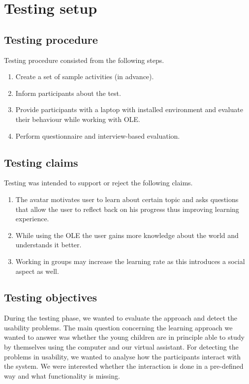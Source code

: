 \documentclass[a4paper]{article}
\begin{document}
\section{Testing setup}

\subsection{Testing procedure} 

Testing procedure consisted from the following steps.

\begin{enumerate}
	\item Create a set of sample activities (in advance).
	\item Inform participants about the test.
	\item Provide participants with a laptop with installed environment and evaluate their behaviour while working with OLE.
	\item Perform questionnaire and interview-based evaluation.
\end{enumerate}

\subsection{Testing claims}

Testing was intended to support or reject the following claims.

\begin{enumerate}
	\item The avatar motivates user to learn about certain topic and asks questions that allow the user to reflect back on his progress thus improving learning experience.
	\item While using the OLE the user gains more knowledge about the world and understands it better. 
	\item Working in groups may increase the learning rate as this introduces a social aspect as well.
\end{enumerate}

\subsection{Testing objectives}

During the testing phase, we wanted to evaluate the approach and detect the usability problems. The main question concerning the learning approach we wanted to answer was whether the young children are in principle able to study by themselves using the computer and our virtual assistant. For detecting the problems in usability, we wanted to analyse how the participants interact with the system. We were interested whether the interaction is done in a pre-defined way and what functionality is missing.
\end{document}
